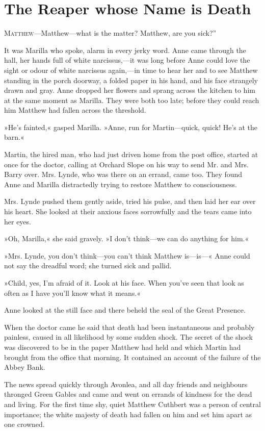 \chapter{The Reaper whose Name is Death}

\lettrine[ante=“,lines=4]{M}{atthew}—Matthew—what is the matter? Matthew, are you sick?”

\zz
It was Marilla who spoke, alarm in every jerky word. Anne came through the hall, her hands full of white narcissus,—it was long before Anne could love the sight or odour of white narcissus again,—in time to hear her and to see Matthew standing in the porch doorway, a folded paper in his hand, and his face strangely drawn and gray. Anne dropped her flowers and sprang across the kitchen to him at the same moment as Marilla. They were both too late; before they could reach him Matthew had fallen across the threshold.

»He's fainted,« gasped Marilla. »Anne, run for Martin—quick, quick! He's at the barn.«

Martin, the hired man, who had just driven home from the post office, started at once for the doctor, calling at Orchard Slope on his way to send Mr. and Mrs. Barry over. Mrs. Lynde, who was there on an errand, came too. They found Anne and Marilla distractedly trying to restore Matthew to consciousness.

Mrs. Lynde pushed them gently aside, tried his pulse, and then laid her ear over his heart. She looked at their anxious faces sorrowfully and the tears came into her eyes.

»Oh, Marilla,« she said gravely. »I don't think—we can do anything for him.«

»Mrs. Lynde, you don't think—you can't think Matthew is—is—« Anne could not say the dreadful word; she turned sick and pallid.

»Child, yes, I'm afraid of it. Look at his face. When you've seen that look as often as I have you'll know what it means.«

Anne looked at the still face and there beheld the seal of the Great Presence.

When the doctor came he said that death had been instantaneous and probably painless, caused in all likelihood by some sudden shock. The secret of the shock was discovered to be in the paper Matthew had held and which Martin had brought from the office that morning. It contained an account of the failure of the Abbey Bank.

The news spread quickly through Avonlea, and all day friends and neighbours thronged Green Gables and came and went on errands of kindness for the dead and living. For the first time shy, quiet Matthew Cuthbert was a person of central importance; the white majesty of death had fallen on him and set him apart as one crowned.

